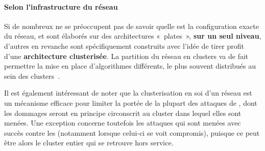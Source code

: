         \paragraph{Selon l'infrastructure du réseau}
Si de nombreux \IDS ne se préoccupent pas de savoir quelle est la configuration exacte du réseau, et sont élaborés sur des architectures « plates », \textbf{sur un seul niveau}, d'autres en revanche sont spécifiquement construits avec l'idée de tirer profit d'une \textbf{architecture clusterisée}.
La partition du réseau en clusters va de fait permettre la mise en place d'algorithmes différents, le plus souvent distribués au sein des clusters~\cite{SJ11}.

Il est également intéressant de noter que la clusterisation en soi d'un réseau est un mécanisme efficace pour limiter la portée de la plupart des attaques de \dds, dont les dommages seront en principe circonscrit au cluster dans lequel elles sont menées.
Une exception concerne toutefois les attaques qui sont menées avec succès contre les \ch (notamment lorsque celui-ci se voit compromis), puisque ce peut être alors le cluster entier qui se retrouve hors service.

